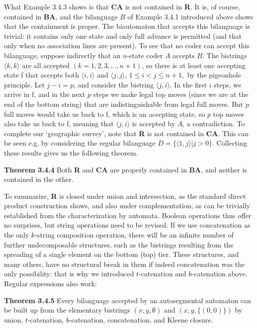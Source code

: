 What Example 3.4.3 shows is that {\bf CA} is not contained in {\bf R}.  It is,
of course, contained in {\bf BA}, and the bilanguage $B$ of Example 3.4.1
introduced above shows that the containment is proper.  The biautomaton that
accepts this bilanguage is trivial: it contains only one state and only full
advance is permitted (and that only when no association lines are present). To
see that no coder can accept this bilanguage, suppose indirectly that an
$n$-state coder $A$ accepts $B$.  The bistrings $\langle k,k\rangle $ are all
accepted $(k=1,2,3,...,n+1)$, so there is at least one accepting state f that
accepts both $\langle i,i\rangle $ and $\langle j,j\rangle $, $1\leq i<j\leq
n+1,$ by the pigeonhole principle. Let $j-i=p$, and consider the bistring
$\langle j,i\rangle $. In the first $i$ steps, we arrive in f, and in the next
$p$ steps we make legal top moves (since we are at the end of the bottom
string) that are indistinguishable from legal full moves.  But $p$ full moves
would take us back to f, which is an accepting state, so $p$ top moves also
take us back to f, meaning that $\langle j,i\rangle $ is accepted by $A$, a
contradiction. To complete our `geographic survey', note that {\bf R} is not
contained in {\bf CA}. This can be seen e.g.  by considering the regular
bilanguage $D=\{\langle 1,j\rangle | j > 0\}$.  Collecting these results gives
us the following theorem.

\smallskip\noindent
{\bf Theorem 3.4.4} Both {\bf R} and {\bf CA} are properly contained in {\bf
BA}, and neither is contained in the other.

\medskip\noindent
To summarize, {\bf R} is closed under union and intersection, as the standard
direct product construction shows, and also under complementation, as can be
trivially established from the characterization by automata. Boolean
operations thus offer no surprises, but string operations need to be revised.
If we use concatenation as the only $k$-string composition operation, there
will be an infinite number of further undecomposable structures, such as the
bistrings resulting from the spreading of a single element on the bottom (top)
tier. These structures, and many others, have no structural break in them if
indeed concatenation was the only possibility: that is why we introduced
$t$-catenation and $b$-catenation above. Regular expressions also work: 

\smallskip\noindent
{\bf Theorem 3.4.5} Every bilanguage accepted by an autosegmental automaton
can be built up from the elementary bistrings $(x,y,\emptyset)$ and
$(x,y,\{(0,0)\})$ by union, $t$-catenation, $b$-catenation, concatenation, and
Kleene closure.


